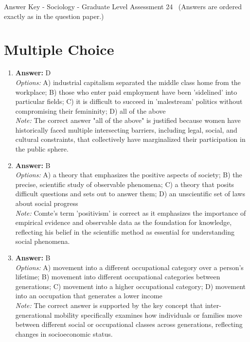 \documentclass[12pt]{article}
\begin{document}
\begin{center}
Answer Key - Sociology - Graduate Level Assessment 24 \
\small (Answers are ordered exactly as in the question paper.)
\end{center}

\section*{Multiple Choice}
\begin{enumerate}[label=\arabic*.]
\item \textbf{Answer:} D
\\ \textit{Options:} A) industrial capitalism separated the middle class home from the workplace; B) those who enter paid employment have been 'sidelined' into particular fields; C) it is difficult to succeed in 'malestream' politics without compromising their femininity; D) all of the above
\\ \textit{Note:} The correct answer "all of the above" is justified because women have historically faced multiple intersecting barriers, including legal, social, and cultural constraints, that collectively have marginalized their participation in the public sphere.
\item \textbf{Answer:} B
\\ \textit{Options:} A) a theory that emphasizes the positive aspects of society; B) the precise, scientific study of observable phenomena; C) a theory that posits difficult questions and sets out to answer them; D) an unscientific set of laws about social progress
\\ \textit{Note:} Comte's term 'positivism' is correct as it emphasizes the importance of empirical evidence and observable data as the foundation for knowledge, reflecting his belief in the scientific method as essential for understanding social phenomena.
\item \textbf{Answer:} B
\\ \textit{Options:} A) movement into a different occupational category over a person's lifetime; B) movement into different occupational categories between generations; C) movement into a higher occupational category; D) movement into an occupation that generates a lower income
\\ \textit{Note:} The correct answer is supported by the key concept that inter-generational mobility specifically examines how individuals or families move between different social or occupational classes across generations, reflecting changes in socioeconomic status.

\end{enumerate}
\end{document}

